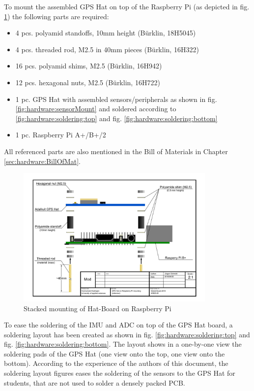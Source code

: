To mount the assembled GPS Hat on top of the Raspberry Pi (as depicted in fig. \ref{fig:hardware:stackedMount}) the following parts are required:
\begin{itemize}
	\item 4 pcs. polyamid standoffs, 10mm height (B\"urklin, 18H5045)
	\item 4 pcs. threaded rod, M2.5 in 40mm pieces (B\"urklin, 16H322)
	\item 16 pcs. polyamid shims, M2.5 (B\"urklin, 16H942)
	\item 12 pcs. hexagonal nuts, M2.5 (B\"urklin, 16H722)
	\item 1 pc. GPS Hat with assembled sensors/peripherals as shown in fig. \ref{fig:hardware:sensorMount} and soldered according to \ref{fig:hardware:soldering:top} and fig. \ref{fig:hardware:soldering:bottom}
	\item 1 pc. Raspberry Pi A+/B+/2
\end{itemize}
All referenced parts are also mentioned in the Bill of Materials in Chapter \ref{sec:hardware:BillOfMat}.

\begin{figure}[H]
    \centering
    \includegraphics[width=0.87\textwidth]{fig/ch-rpi-hardware/A4_tech_draw_sideview_stackedMount}
    \caption{Stacked mounting of Hat-Board on Raspberry Pi}
    \label{fig:hardware:stackedMount}
\end{figure}

To ease the soldering of the IMU and ADC on top of the GPS Hat board, a soldering layout has been created as shown in fig. \ref{fig:hardware:soldering:top} and fig. \ref{fig:hardware:soldering:bottom}. The layout shows in a one-by-one view the soldering pads of the GPS Hat (one view onto the top, one view onto the bottom). According to the experience of the authors of this document, the soldering layout figures eases the soldering of the sensors to the GPS Hat for students, that are not used to solder a densely packed PCB.

